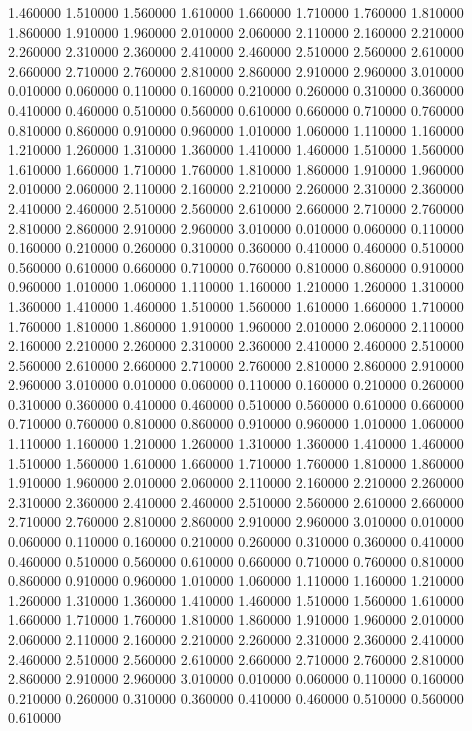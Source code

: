 1.460000
1.510000
1.560000
1.610000
1.660000
1.710000
1.760000
1.810000
1.860000
1.910000
1.960000
2.010000
2.060000
2.110000
2.160000
2.210000
2.260000
2.310000
2.360000
2.410000
2.460000
2.510000
2.560000
2.610000
2.660000
2.710000
2.760000
2.810000
2.860000
2.910000
2.960000
3.010000
0.010000
0.060000
0.110000
0.160000
0.210000
0.260000
0.310000
0.360000
0.410000
0.460000
0.510000
0.560000
0.610000
0.660000
0.710000
0.760000
0.810000
0.860000
0.910000
0.960000
1.010000
1.060000
1.110000
1.160000
1.210000
1.260000
1.310000
1.360000
1.410000
1.460000
1.510000
1.560000
1.610000
1.660000
1.710000
1.760000
1.810000
1.860000
1.910000
1.960000
2.010000
2.060000
2.110000
2.160000
2.210000
2.260000
2.310000
2.360000
2.410000
2.460000
2.510000
2.560000
2.610000
2.660000
2.710000
2.760000
2.810000
2.860000
2.910000
2.960000
3.010000
0.010000
0.060000
0.110000
0.160000
0.210000
0.260000
0.310000
0.360000
0.410000
0.460000
0.510000
0.560000
0.610000
0.660000
0.710000
0.760000
0.810000
0.860000
0.910000
0.960000
1.010000
1.060000
1.110000
1.160000
1.210000
1.260000
1.310000
1.360000
1.410000
1.460000
1.510000
1.560000
1.610000
1.660000
1.710000
1.760000
1.810000
1.860000
1.910000
1.960000
2.010000
2.060000
2.110000
2.160000
2.210000
2.260000
2.310000
2.360000
2.410000
2.460000
2.510000
2.560000
2.610000
2.660000
2.710000
2.760000
2.810000
2.860000
2.910000
2.960000
3.010000
0.010000
0.060000
0.110000
0.160000
0.210000
0.260000
0.310000
0.360000
0.410000
0.460000
0.510000
0.560000
0.610000
0.660000
0.710000
0.760000
0.810000
0.860000
0.910000
0.960000
1.010000
1.060000
1.110000
1.160000
1.210000
1.260000
1.310000
1.360000
1.410000
1.460000
1.510000
1.560000
1.610000
1.660000
1.710000
1.760000
1.810000
1.860000
1.910000
1.960000
2.010000
2.060000
2.110000
2.160000
2.210000
2.260000
2.310000
2.360000
2.410000
2.460000
2.510000
2.560000
2.610000
2.660000
2.710000
2.760000
2.810000
2.860000
2.910000
2.960000
3.010000
0.010000
0.060000
0.110000
0.160000
0.210000
0.260000
0.310000
0.360000
0.410000
0.460000
0.510000
0.560000
0.610000
0.660000
0.710000
0.760000
0.810000
0.860000
0.910000
0.960000
1.010000
1.060000
1.110000
1.160000
1.210000
1.260000
1.310000
1.360000
1.410000
1.460000
1.510000
1.560000
1.610000
1.660000
1.710000
1.760000
1.810000
1.860000
1.910000
1.960000
2.010000
2.060000
2.110000
2.160000
2.210000
2.260000
2.310000
2.360000
2.410000
2.460000
2.510000
2.560000
2.610000
2.660000
2.710000
2.760000
2.810000
2.860000
2.910000
2.960000
3.010000
0.010000
0.060000
0.110000
0.160000
0.210000
0.260000
0.310000
0.360000
0.410000
0.460000
0.510000
0.560000
0.610000
